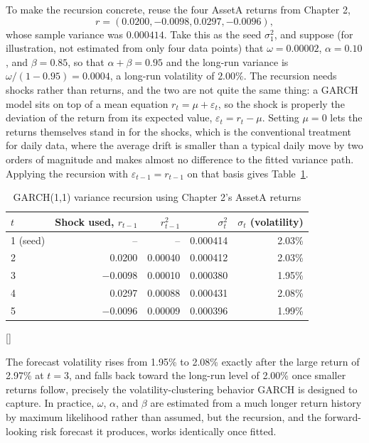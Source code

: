 \documentclass[../ai_in_finance]{subfiles}
\begin{document}
To make the recursion concrete, reuse the four AssetA returns from Chapter 2,
$$r = (0.0200, -0.0098, 0.0297, -0.0096),$$
whose sample variance was $0.000414$. Take this as the seed $\sigma_1^2$, and suppose (for illustration, not estimated from only four data points) that $\omega = 0.00002$, $\alpha = 0.10$, and $\beta = 0.85$, so that $\alpha+\beta = 0.95$ and the long-run variance is $\omega/(1-0.95) = 0.0004$, a long-run volatility of $2.00\%$. The recursion needs shocks rather than returns, and the two are not quite the same thing: a GARCH model sits on top of a mean equation $r_t = \mu + \varepsilon_t$, so the shock is properly the deviation of the return from its expected value, $\varepsilon_t = r_t - \mu$. Setting $\mu = 0$ lets the returns themselves stand in for the shocks, which is the conventional treatment for daily data, where the average drift is smaller than a typical daily move by two orders of magnitude and makes almost no difference to the fitted variance path. Applying the recursion with $\varepsilon_{t-1} = r_{t-1}$ on that basis gives Table~\ref{tab:garch_recursion}.

\begin{table}[htbp]
\centering
\begin{lrbox}{\bookmeasuredbox}
\begin{tabular}{lrrrr}
\toprule
$t$ & Shock used, $r_{t-1}$ & $r_{t-1}^2$ & $\sigma_t^2$ & $\sigma_t$ (volatility) \\
\midrule
1 (seed) & --      & --      & 0.000414  & 2.03\% \\
2        & 0.0200  & 0.00040 & 0.000412  & 2.03\% \\
3        & $-0.0098$ & 0.00010 & 0.000380 & 1.95\% \\
4        & 0.0297  & 0.00088 & 0.000431  & 2.08\% \\
5        & $-0.0096$ & 0.00009 & 0.000396 & 1.99\% \\
\bottomrule
\end{tabular}
\end{lrbox}
\ifdim\wd\bookmeasuredbox<0.65\linewidth
\setlength{\bookcapwidth}{0.65\linewidth}
\else
\setlength{\bookcapwidth}{\wd\bookmeasuredbox}
\fi
{}[\bookcapwidth]{
\usebox{\bookmeasuredbox}
}{
\caption{GARCH(1,1) variance recursion using Chapter 2's AssetA returns}
\label{tab:garch_recursion}
}
\end{table}

The forecast volatility rises from 1.95\% to 2.08\% exactly after the large return of 2.97\% at $t=3$, and falls back toward the long-run level of 2.00\% once smaller returns follow, precisely the volatility-clustering behavior GARCH is designed to capture. In practice, $\omega$, $\alpha$, and $\beta$ are estimated from a much longer return history by maximum likelihood rather than assumed, but the recursion, and the forward-looking risk forecast it produces, works identically once fitted.
\end{document}
